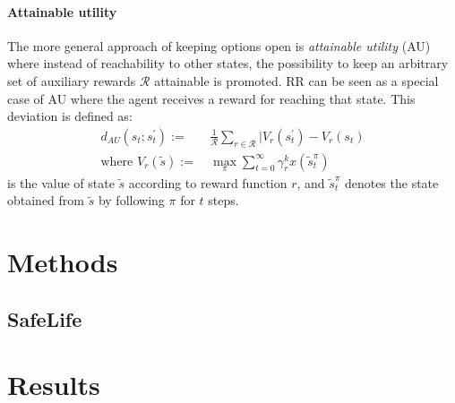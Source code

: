 \documentclass[12pt,A4]{report}
\theoremstyle{definition}
\begin{document}
\subsubsection{Attainable utility}
The more general approach of keeping options open is \textit{attainable utility} (AU) where instead of reachability to other states, the possibility to keep an arbitrary set of auxiliary rewards $\mathcal{R}$ attainable is promoted. RR can be seen as a special case of AU where the agent receives a reward for reaching that state. This deviation is defined as:
\begin{align*}
  d_{AU}(s_t;s_t^\prime) := & \ \frac{1}{\mathcal{R}} \sum_{r\in\mathcal{R}} |V_r(s_t^\prime) - V_r(s_t) \\
  \text{where } V_r(\tilde{s}) := & \ \max_\pi \sum_{t=0}^\infty \gamma_r^k x(\tilde{s}_t^\pi)
\end{align*}
is the value of state $\tilde{s}$ according to reward function $r$, and $\tilde{s}_t^\pi$ denotes the state obtained from $\tilde{s}$ by following $\pi$ for $t$ steps.





\chapter{Methods}

\section{SafeLife}





\chapter{Results}
\end{document}
